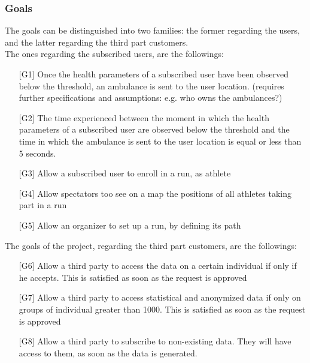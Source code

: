 \subsubsection{Goals}
The goals can be distinguished into two families: the former regarding the users, and the latter regarding the third part customers.\\
The ones regarding the subscribed users, are the followings:
\begin{enumerate}
\item[{[G1]}] Once the health parameters of a subscribed user have been observed 
below the threshold, an ambulance is sent to the user location. (requires further specifications and assumptions: e.g. who owns the ambulances?)
\item[{[G2]}] The time experienced between the moment in which the health parameters of a subscribed user are observed below the threshold and the time in which the ambulance is sent to the user location is equal or less than 5 seconds. 
\item[{[G3]}] Allow a subscribed user to enroll in a run, as athlete
\item[{[G4]}] Allow spectators too see on a map the positions of all athletes taking part in a run
\item[{[G5]}] Allow an organizer to set up a run, by defining its path
\end{enumerate}
The goals of the project, regarding the third part customers, are the followings:
\begin{enumerate}
\item[{[G6]}] Allow a third party to access the data on a certain individual if only if he accepts. This is satisfied as soon as the request is approved
\item[{[G7]}] Allow a third party to access statistical and anonymized data if only on groups of individual greater than 1000. This is satisfied as soon as the request is approved
\item[{[G8]}] Allow a third party to subscribe to non-existing data. They will have access to them, as soon as the data is generated. 
\end{enumerate}